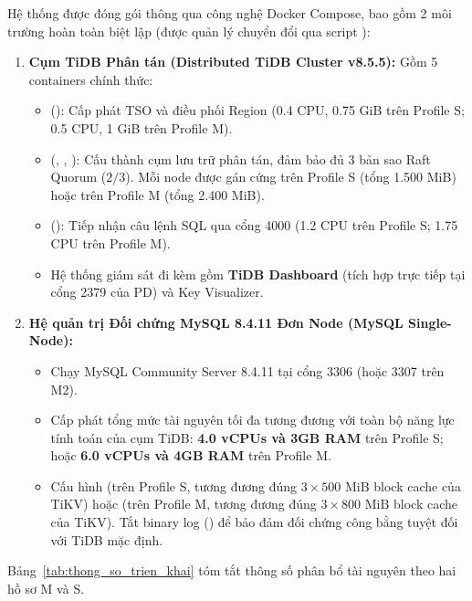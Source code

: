 Hệ thống được đóng gói thông qua công nghệ Docker Compose, bao gồm 2 môi trường hoàn toàn biệt lập (được quản lý chuyển đổi qua script ):
\begin{enumerate}
  \item \textbf{Cụm TiDB Phân tán (Distributed TiDB Cluster v8.5.5):} Gồm 5 containers chính thức:
  \begin{itemize}
    \item {} (): Cấp phát TSO và điều phối Region (0.4 CPU, 0.75 GiB trên Profile S; 0.5 CPU, 1 GiB trên Profile M).
    \item {} (, , ): Cấu thành cụm lưu trữ phân tán, đảm bảo đủ 3 bản sao Raft Quorum ($2/3$). Mỗi node được gán cứng  trên Profile S (tổng 1.500 MiB) hoặc  trên Profile M (tổng 2.400 MiB).
    \item {} (): Tiếp nhận câu lệnh SQL qua cổng 4000 (1.2 CPU trên Profile S; 1.75 CPU trên Profile M).
    \item Hệ thống giám sát đi kèm gồm \textbf{TiDB Dashboard} (tích hợp trực tiếp tại cổng 2379 của PD) và Key Visualizer.
  \end{itemize}
  \item \textbf{Hệ quản trị Đối chứng MySQL 8.4.11 Đơn Node (MySQL Single-Node):}
  \begin{itemize}
    \item Chạy MySQL Community Server 8.4.11 tại cổng 3306 (hoặc 3307 trên M2).
    \item Cấp phát tổng mức tài nguyên tối đa tương đương với toàn bộ năng lực tính toán của cụm TiDB: \textbf{4.0 vCPUs và 3GB RAM} trên Profile S; hoặc \textbf{6.0 vCPUs và 4GB RAM} trên Profile M.
    \item Cấu hình  (trên Profile S, tương đương đúng $3 \times 500\text{ MiB}$ block cache của TiKV) hoặc  (trên Profile M, tương đương đúng $3 \times 800\text{ MiB}$ block cache của TiKV). Tắt binary log () để bảo đảm đối chứng công bằng tuyệt đối với TiDB mặc định.
  \end{itemize}
\end{enumerate}

Bảng~\ref{tab:thong_so_trien_khai} tóm tắt thông số phân bổ tài nguyên theo hai hồ sơ M và S.

